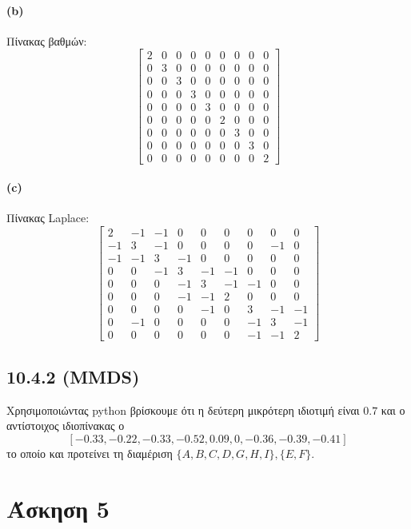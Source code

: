 \documentclass[a4paper,11pt]{article}
\begin{document}
\paragraph{(b)} Πίνακας βαθμών:
\[
	\begin{bmatrix}
		2 & 0 & 0 & 0 & 0 & 0 & 0 & 0 & 0 \\
		0 & 3 & 0 & 0 & 0 & 0 & 0 & 0 & 0 \\
		0 & 0 & 3 & 0 & 0 & 0 & 0 & 0 & 0 \\
		0 & 0 & 0 & 3 & 0 & 0 & 0 & 0 & 0 \\
		0 & 0 & 0 & 0 & 3 & 0 & 0 & 0 & 0 \\
		0 & 0 & 0 & 0 & 0 & 2 & 0 & 0 & 0 \\
		0 & 0 & 0 & 0 & 0 & 0 & 3 & 0 & 0 \\
		0 & 0 & 0 & 0 & 0 & 0 & 0 & 3 & 0 \\
		0 & 0 & 0 & 0 & 0 & 0 & 0 & 0 & 2
	\end{bmatrix}
\]

\paragraph{(c)} Πίνακας Laplace:
\[
	\begin{bmatrix}
		2 & -1 & -1 & 0 & 0 & 0 & 0 & 0 & 0 \\
		-1 & 3 & -1 & 0 & 0 & 0 & 0 & -1 & 0 \\
		-1 & -1 & 3 & -1 & 0 & 0 & 0 & 0 & 0 \\
		0 & 0 & -1 & 3 & -1 & -1 & 0 & 0 & 0 \\
		0 & 0 & 0 & -1 & 3 & -1 & -1 & 0 & 0 \\
		0 & 0 & 0 & -1 & -1 & 2 & 0 & 0 & 0 \\
		0 & 0 & 0 & 0 & -1 & 0 & 3 & -1 & -1 \\
		0 & -1 & 0 & 0 & 0 & 0 & -1 & 3 & -1 \\
		0 & 0 & 0 & 0 & 0 & 0 & -1 & -1 & 2
	\end{bmatrix}
\]

\subsection*{10.4.2 (MMDS)}

Χρησιμοποιώντας python βρίσκουμε ότι η δεύτερη μικρότερη ιδιοτιμή είναι $0.7$ και ο αντίστοιχος ιδιοπίνακας ο
\[[-0.33,-0.22,-0.33,-0.52,0.09,0,-0.36,-0.39,-0.41]\]
το οποίο και προτείνει τη διαμέριση $\{A,B,C,D,G,H,I\},\{E,F\}$.


\section*{Άσκηση 5}
\end{document}
